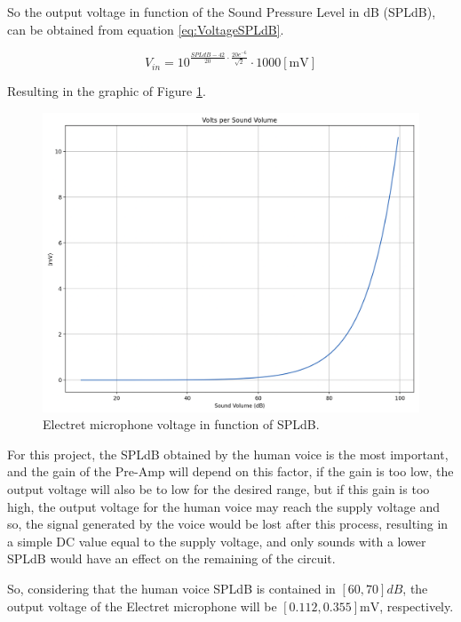 So the output voltage in function of the Sound Pressure Level in dB (SPLdB), can be obtained from equation \ref{eq:VoltageSPLdB}.

\begin{equation}
    V_{in} = 10^{\frac{SPLdB-42}{20} \cdot \frac{20e^{-6}}{\sqrt{2}} } \cdot 1000 [\si{\milli\volt}]
    \label{eq:VoltageSPLdB}
\end{equation}

Resulting in the graphic of Figure \ref{fig:GraphSPLdB}.

\begin{figure}[H]
    \centering
    \includegraphics*[scale = 0.3]{Images/GraphSPLdB.png}
    \caption{Electret microphone voltage in function of SPLdB.}
    \label{fig:GraphSPLdB}
\end{figure}

For this project, the SPLdB obtained by the human voice is the most important, and the gain of the Pre-Amp will depend on this factor, if the gain is too low, the output voltage will also be to low for the desired range, but if this gain is too high, the output voltage for the human voice may reach the supply voltage and so, the signal generated by the voice would be lost after this process, resulting in a simple DC value equal to the supply voltage, and only sounds with a lower SPLdB would have an effect on the remaining of the circuit.

So, considering that the human voice SPLdB is contained in $[60, 70]dB$, the output voltage of the Electret microphone will be $[0.112, 0.355]\si{\milli\volt}$, respectively.

